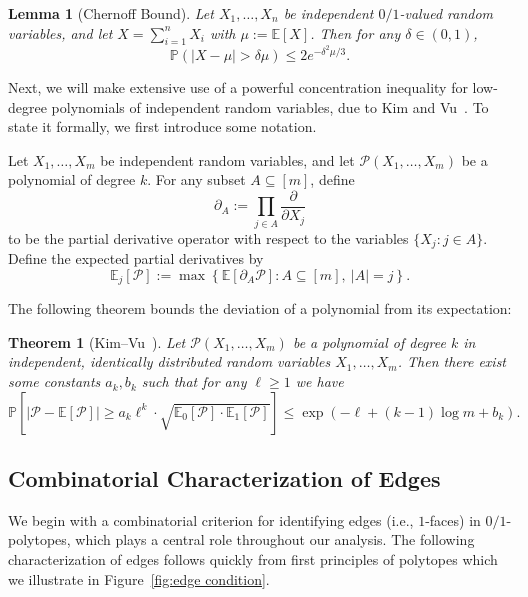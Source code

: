 \documentclass[11pt]{article}
\theoremstyle{definition}
\theoremstyle{plain}
\newtheorem{thm}[definition]{Theorem}
\newtheorem{lemma}[definition]{Lemma}
\begin{document}
\begin{lemma}[Chernoff Bound]\label{chernoff}
Let \( X_1, \ldots, X_n \) be independent $0/1$-valued random variables, and let \( X = \sum_{i=1}^n X_i \) with \( \mu := \mathbb{E}[X] \). Then for any \( \delta \in (0,1) \),
\[
\mathbb{P}(|X - \mu| > \delta \mu) \leq 2e^{-\delta^2 \mu / 3}.
\]
\end{lemma}

Next, we will make extensive use of a powerful concentration inequality for low-degree polynomials of independent random variables, due to Kim and Vu~\cite{KimVuConcentration}. To state it formally, we first introduce some notation.

Let \( X_1, \ldots, X_m \) be independent random variables, and let \( \mathcal P(X_1, \ldots, X_m) \) be a polynomial of degree \( k \). For any subset \( A \subseteq [m] \), define
\[
\partial_A := \prod_{j \in A} \frac{\partial}{\partial X_j}
\]
to be the partial derivative operator with respect to the variables \( \{X_j : j \in A\} \). Define the expected partial derivatives by
\[
\mathbb{E}_j[\mathcal P] := \max\left\{ \mathbb{E}[\partial_A \mathcal P] : A \subseteq [m],\ |A| = j \right\}.
\]

The following theorem bounds the deviation of a polynomial from its expectation:

\begin{thm}[Kim--Vu~\cite{KimVuConcentration}]\label{lem: concentration inequality}
Let \( \mathcal P(X_1, \ldots, X_m) \) be a polynomial of degree \( k \) in independent, identically distributed random variables \( X_1, \ldots, X_m \). Then there exist some constants $a_k, b_k$ such that for any \( \ell \geq 1 \) we have 
\[
\mathbb{P}\left[ \left| \mathcal P - \mathbb{E}[\mathcal P] \right| \geq a_k\ell^k \cdot \sqrt{ \mathbb{E}_0[\mathcal P] \cdot \mathbb{E}_1[\mathcal P] } \right] 
\leq \exp\left( -\ell + (k - 1)\log m +b_k\right).
\] 
\end{thm}




\subsection{Combinatorial Characterization of Edges}

We begin with a combinatorial criterion for identifying edges (i.e., $1$-faces) in $0/1$-polytopes, which plays a central role throughout our analysis.
The following characterization of edges follows quickly from first principles of polytopes which we illustrate in Figure~\ref{fig:edge condition}.
\end{document}

